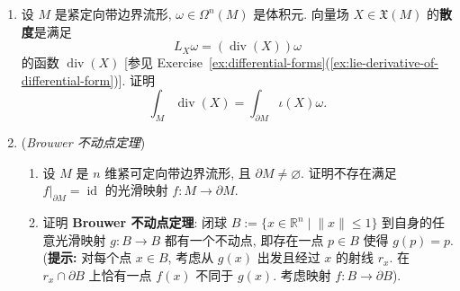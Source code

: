 \begin{RiemannExercise}
\begin{enumerate}[label=(\arabic*),ref=\arabic*,leftmargin=*]
\begin{enumerate}[label=(\alph*),leftmargin=*]
\end{enumerate}
\item\label{ex:divergence-theorem-for-volume-form} 设 $M$ 是紧定向带边界流形, $\omega\in\Omega^n(M)$ 是体积元. 向量场 $X\in\mathfrak{X}(M)$ 的\textbf{散度}是满足
\[
  L_X\omega=(\operatorname{div}(X))\omega
\]
的函数 $\operatorname{div}(X)$ [参见 Exercise~\ref{ex:differential-forms}(\ref{ex:lie-derivative-of-differential-form})]. 证明
\[
  \int_M\operatorname{div}(X)=\int_{\partial M}\iota(X)\omega.
\]
\item\label{ex:brouwer-fixed-point-theorem} (\emph{Brouwer 不动点定理})
\begin{enumerate}[label=(\alph*),leftmargin=*]
\item 设 $M$ 是 $n$ 维紧可定向带边界流形, 且 $\partial M\ne\varnothing$. 证明不存在满足 $f|_{\partial M}=\operatorname{id}$ 的光滑映射 $f:M\to\partial M$.
\item 证明 \textbf{Brouwer 不动点定理}: 闭球 $B:=\{x\in\mathbb{R}^n\mid\lVert x\rVert\leq1\}$ 到自身的任意光滑映射 $g:B\to B$ 都有一个不动点, 即存在一点 $p\in B$ 使得 $g(p)=p$.
{\small (\textbf{提示:} 对每个点 $x\in B$, 考虑从 $g(x)$ 出发且经过 $x$ 的射线 $r_x$. 在 $r_x\cap\partial B$ 上恰有一点 $f(x)$ 不同于 $g(x)$. 考虑映射 $f:B\to\partial B$).}
\end{enumerate}
\end{enumerate}
\end{RiemannExercise}
